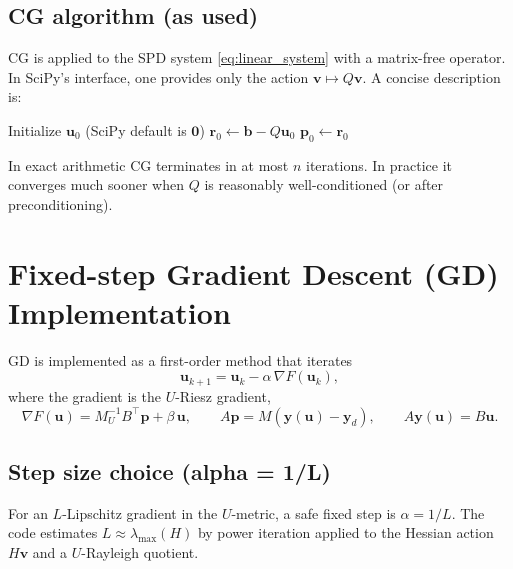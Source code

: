 \documentclass[11pt,a4paper]{article}
\begin{document}
\subsection{CG algorithm (as used)}
CG is applied to the SPD system \eqref{eq:linear_system} with a matrix-free operator. In SciPy's interface, one provides only the action $\mathbf{v}\mapsto Q\mathbf{v}$. A concise description is:

\begin{algorithm}
\caption{Conjugate Gradient for the minimizer $\mathbf{u}_*$}
Initialize $\mathbf{u}_0$ (SciPy default is $\mathbf{0}$)\;
$\mathbf{r}_0 \gets \mathbf{b} - Q\mathbf{u}_0$\;
$\mathbf{p}_0 \gets \mathbf{r}_0$\;
\end{algorithm}

In exact arithmetic CG terminates in at most $n$ iterations. In practice it converges much sooner when $Q$ is reasonably well-conditioned (or after preconditioning).

\section{Fixed-step Gradient Descent (GD) Implementation}
GD is implemented as a first-order method that iterates
\begin{equation}
  \mathbf{u}_{k+1} = \mathbf{u}_k - \alpha\, \nabla F(\mathbf{u}_k),
\end{equation}
where the gradient is the $U$-Riesz gradient,
\begin{equation}
  \nabla F(\mathbf{u}) = M_U^{-1}B^\top\mathbf{p} + \beta\,\mathbf{u},
  \qquad
  A\mathbf{p} = M(\mathbf{y}(\mathbf{u})-\mathbf{y}_d),
  \qquad
  A\mathbf{y}(\mathbf{u}) = B\mathbf{u}.
\end{equation}

\subsection{Step size choice (alpha = 1/L)}
For an $L$-Lipschitz gradient in the $U$-metric, a safe fixed step is $\alpha=1/L$. The code estimates $L\approx\lambda_{\max}(H)$ by power iteration applied to the Hessian action $H\mathbf{v}$ and a $U$-Rayleigh quotient.
\end{document}
